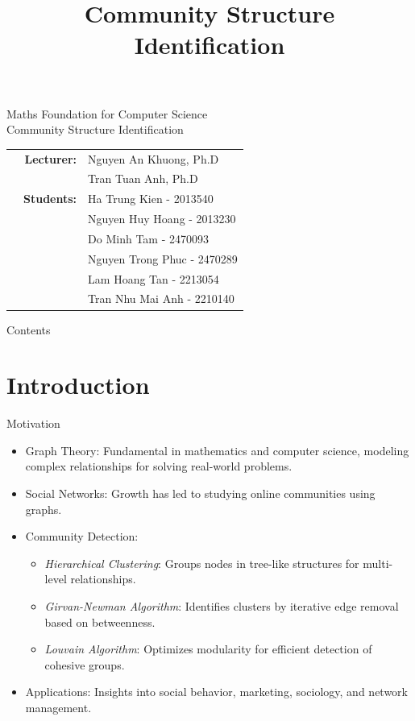 \documentclass[compress]{beamer}
\title{Community Structure Identification}
\begin{document}
\begin{frame}[t]  
    \Large Maths Foundation for Computer Science \\
    \textcolor{SectionName}{ Community Structure Identification}

    \normalsize
    \vspace{1.5cm}
    
    \begin{table}[h]
        \begin{tabular}{rrl}
            \hspace{1.5cm}
            & \textbf{Lecturer:} 
            & Nguyen An Khuong, Ph.D \\
            && Tran Tuan Anh, Ph.D \\
            & \textbf{Students:} 
            & Ha Trung Kien	- 2013540 \\
            & & Nguyen Huy Hoang - 2013230 \\
            & & Do Minh Tam - 2470093 \\
            & & Nguyen Trong Phuc - 2470289 \\
            & & Lam Hoang Tan - 2213054 \\
            & & Tran Nhu Mai Anh - 2210140 \\
        \end{tabular}
    \end{table}
\end{frame}

\begin{frame}{Contents}
    \tableofcontents
\end{frame}

\section{Introduction}

\begin{frame}[t]{Motivation}
    \begin{itemize}
        \item Graph Theory: Fundamental in mathematics and computer science, modeling complex relationships for solving real-world problems.
        \item Social Networks: Growth has led to studying online communities using graphs.
        \item Community Detection:
        \begin{itemize}
            \item \textit{Hierarchical Clustering}: Groups nodes in tree-like structures for multi-level relationships.
            \item \textit{Girvan-Newman Algorithm}: Identifies clusters by iterative edge removal based on betweenness.
            \item \textit{Louvain Algorithm}: Optimizes modularity for efficient detection of cohesive groups.
        \end{itemize}
        \item Applications: Insights into social behavior, marketing, sociology, and network management.
    \end{itemize}
\end{frame}
\end{document}
